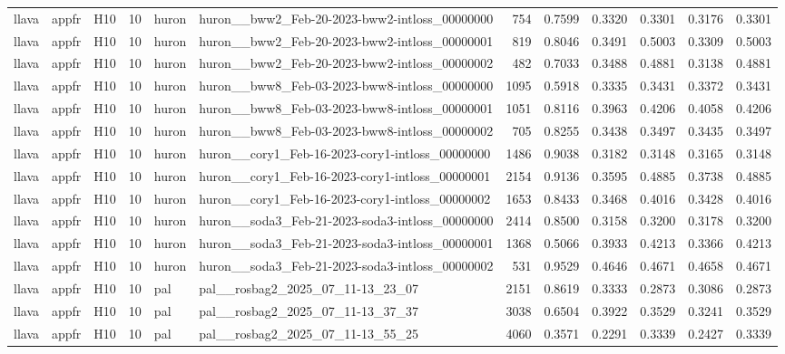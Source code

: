 \begin{table}[tbp]
\begin{tabular}{lllrllrrrrrr}
llava & appfr & H10 & 10 & huron & huron\_\_bww2\_Feb-20-2023-bww2-intloss\_00000000 & 754 & 0.7599 & 0.3320 & 0.3301 & 0.3176 & 0.3301 \\
llava & appfr & H10 & 10 & huron & huron\_\_bww2\_Feb-20-2023-bww2-intloss\_00000001 & 819 & 0.8046 & 0.3491 & 0.5003 & 0.3309 & 0.5003 \\
llava & appfr & H10 & 10 & huron & huron\_\_bww2\_Feb-20-2023-bww2-intloss\_00000002 & 482 & 0.7033 & 0.3488 & 0.4881 & 0.3138 & 0.4881 \\
llava & appfr & H10 & 10 & huron & huron\_\_bww8\_Feb-03-2023-bww8-intloss\_00000000 & 1095 & 0.5918 & 0.3335 & 0.3431 & 0.3372 & 0.3431 \\
llava & appfr & H10 & 10 & huron & huron\_\_bww8\_Feb-03-2023-bww8-intloss\_00000001 & 1051 & 0.8116 & 0.3963 & 0.4206 & 0.4058 & 0.4206 \\
llava & appfr & H10 & 10 & huron & huron\_\_bww8\_Feb-03-2023-bww8-intloss\_00000002 & 705 & 0.8255 & 0.3438 & 0.3497 & 0.3435 & 0.3497 \\
llava & appfr & H10 & 10 & huron & huron\_\_cory1\_Feb-16-2023-cory1-intloss\_00000000 & 1486 & 0.9038 & 0.3182 & 0.3148 & 0.3165 & 0.3148 \\
llava & appfr & H10 & 10 & huron & huron\_\_cory1\_Feb-16-2023-cory1-intloss\_00000001 & 2154 & 0.9136 & 0.3595 & 0.4885 & 0.3738 & 0.4885 \\
llava & appfr & H10 & 10 & huron & huron\_\_cory1\_Feb-16-2023-cory1-intloss\_00000002 & 1653 & 0.8433 & 0.3468 & 0.4016 & 0.3428 & 0.4016 \\
llava & appfr & H10 & 10 & huron & huron\_\_soda3\_Feb-21-2023-soda3-intloss\_00000000 & 2414 & 0.8500 & 0.3158 & 0.3200 & 0.3178 & 0.3200 \\
llava & appfr & H10 & 10 & huron & huron\_\_soda3\_Feb-21-2023-soda3-intloss\_00000001 & 1368 & 0.5066 & 0.3933 & 0.4213 & 0.3366 & 0.4213 \\
llava & appfr & H10 & 10 & huron & huron\_\_soda3\_Feb-21-2023-soda3-intloss\_00000002 & 531 & 0.9529 & 0.4646 & 0.4671 & 0.4658 & 0.4671 \\
llava & appfr & H10 & 10 & pal & pal\_\_rosbag2\_2025\_07\_11-13\_23\_07 & 2151 & 0.8619 & 0.3333 & 0.2873 & 0.3086 & 0.2873 \\
llava & appfr & H10 & 10 & pal & pal\_\_rosbag2\_2025\_07\_11-13\_37\_37 & 3038 & 0.6504 & 0.3922 & 0.3529 & 0.3241 & 0.3529 \\
llava & appfr & H10 & 10 & pal & pal\_\_rosbag2\_2025\_07\_11-13\_55\_25 & 4060 & 0.3571 & 0.2291 & 0.3339 & 0.2427 & 0.3339 \\

\end{tabular}
\end{table}
